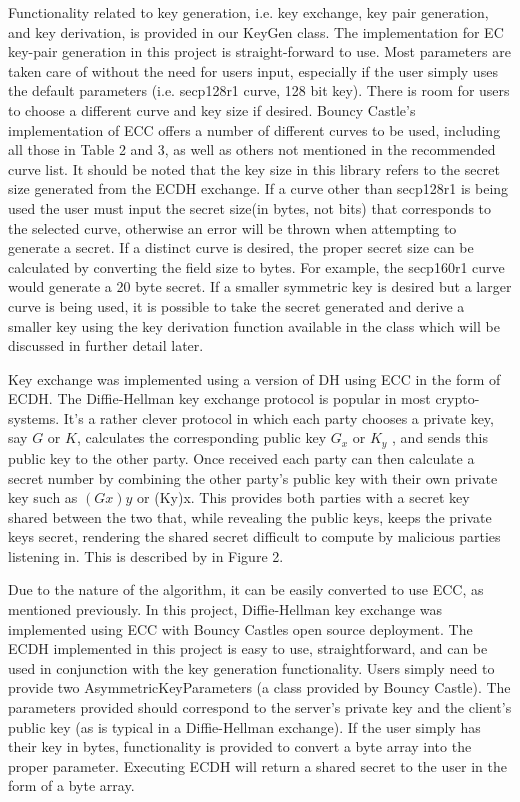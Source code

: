 Functionality related to key generation, i.e. key exchange, key pair generation, and key derivation, is provided in our KeyGen class. The implementation for EC key-pair generation in this project is straight-forward to use. Most parameters are taken care of without the need for users input, especially if the user simply uses the default parameters (i.e. secp128r1 curve, 128 bit key). There is room for users to choose a different curve and key size if desired. Bouncy Castle's implementation of ECC offers a number of different curves to be used, including all those in Table 2 and 3, as well as others not mentioned in the recommended curve list. It should be noted that the key size in this library refers to the secret size generated from the ECDH exchange. If a curve other than secp128r1 is being used the user must input the secret size(in bytes, not bits) that corresponds to the selected curve, otherwise an error will be thrown when attempting to generate a secret. If a distinct curve is desired, the proper secret size can be calculated by converting the field size to bytes. For example, the secp160r1 curve would generate a 20 byte secret.  If a smaller symmetric key is desired but a larger curve is being used, it is possible to take the secret generated and derive a smaller key using the key derivation function available in the class which will be discussed in further detail later.

Key exchange was implemented using a version of DH using ECC in the form of ECDH. The Diffie-Hellman key exchange protocol is popular in most crypto-systems. It's a rather clever protocol in which each party chooses a private key, say $G$ or $K$, calculates the corresponding public key $G_x$  or $K_y$ , and sends this public key to the other party. Once received each party can then calculate a secret number by combining the other party's public key with their own private key such as $(Gx)y$ or (Ky)x. This provides both parties with a secret key shared between the two that, while revealing the public keys, keeps the private keys secret, rendering the shared secret difficult to compute by malicious parties listening in. This is described by in Figure 2. 

Due to the nature of the algorithm, it can be easily converted to use ECC, as mentioned previously. In this project, Diffie-Hellman key exchange was implemented using ECC with Bouncy Castles open source deployment. The ECDH  implemented in this project is easy to use, straightforward, and can be used in conjunction with the key generation functionality. Users simply need to provide two AsymmetricKeyParameters (a class provided by Bouncy Castle). The parameters provided should correspond to the server's private key and the client's public key (as is typical in a Diffie-Hellman exchange). If the user simply has their key in bytes, functionality is provided to convert a byte array into the proper parameter. Executing ECDH will return a shared secret to the user in the form of a byte array.

